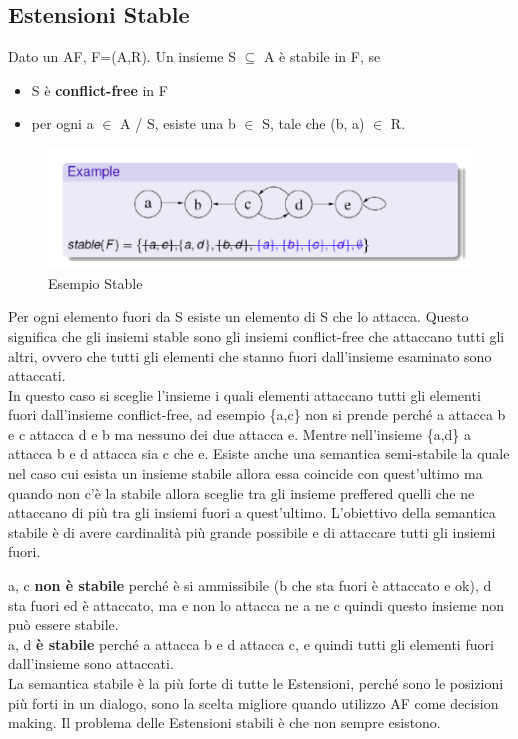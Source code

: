 \subsection{Estensioni Stable}
Dato un AF, F=(A,R). Un insieme S $\subseteq$ A è stabile in F, se
\begin{itemize}
    \item S è \textbf{conflict-free} in F
    \item per ogni a $\in$ A / S, esiste una b $\in$ S, tale che (b, a) $\in$ R.
\end{itemize}
\begin{figure}[htp]
    \centering
    \includegraphics[width=12cm, keepaspectratio]{img/Cap6/stable.png}
    \caption{Esempio Stable}
\end{figure}
Per ogni elemento fuori da S esiste un elemento di S che lo attacca. Questo
significa che gli insiemi stable sono gli insiemi conflict-free che attaccano
tutti gli altri, ovvero che tutti gli elementi che stanno fuori dall'insieme
esaminato sono attaccati.\\
In questo caso si sceglie l'insieme i quali elementi attaccano tutti gli
elementi fuori dall'insieme conflict-free, ad esempio \{a,c\} non si prende
perché a attacca b e c attacca d e b ma nessuno dei due attacca e. Mentre
nell'insieme \{a,d\} a attacca b e d attacca sia c che e. Esiste anche una
semantica semi-stabile la quale nel caso cui esista un insieme stabile allora
essa coincide con quest'ultimo ma quando non c'è la stabile allora sceglie tra
gli insieme preffered quelli che ne attaccano di più tra gli insiemi fuori a
quest'ultimo. L'obiettivo della semantica stabile è di avere cardinalità più
grande possibile e di attaccare tutti gli insiemi fuori.

\vspace{0.5cm}

\noindent a, c \textbf{non è stabile} perché è si ammissibile (b che sta fuori è
attaccato e ok), d sta fuori ed è attaccato, ma e non lo attacca ne a ne c
quindi questo insieme non può essere stabile. \\a, d \textbf{è stabile} perché a
attacca b e d attacca c, e quindi tutti gli elementi fuori dall'insieme sono
attaccati. \\La semantica stabile è la più forte di tutte le Estensioni, perché
sono le posizioni più forti in un dialogo, sono la scelta migliore quando
utilizzo AF come decision making. Il problema delle Estensioni stabili è che non
sempre esistono.

